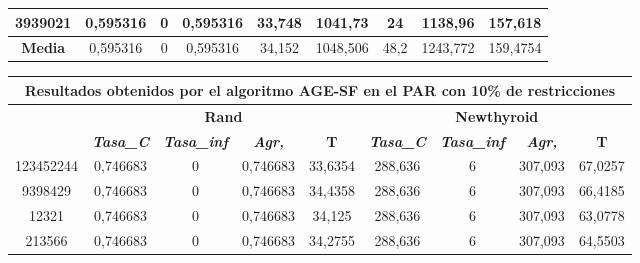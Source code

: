 \documentclass[12pt, spanish]{article}
\begin{document}
\begin{table}[H]
\begin{tabular}{|c|c|c|c|c|c|c|c|c|}
3939021           & 0,595316                  & 0                           & 0,595316               & 33,748     & 1041,73                   & 24                          & 1138,96                & 157,618    \\ \hline
\textbf{Media}    & 0,595316                  & 0                           & 0,595316               & 34,152     & 1048,506                  & 48,2                        & 1243,772               & 159,4754   \\ \hline
\end{tabular}
\end{table}

\begin{table}[H]
\footnotesize
\begin{tabular}{|c|c|c|c|c|c|c|c|c|}
\hline
\multicolumn{9}{|c|}{\textbf{Resultados obtenidos por el algoritmo AGE-SF en el PAR con 10\% de restricciones}}                                                                                                   \\ \hline
\multirow{2}{*}{} & \multicolumn{4}{c|}{\textbf{Rand}}                                                            & \multicolumn{4}{c|}{\textbf{Newthyroid}}                                                      \\ \cline{2-9} 
                  & \textit{\textbf{Tasa\_C}} & \textit{\textbf{Tasa\_inf}} & \textit{\textbf{Agr,}} & \textbf{T} & \textit{\textbf{Tasa\_C}} & \textit{\textbf{Tasa\_inf}} & \textit{\textbf{Agr,}} & \textbf{T} \\ \hline
123452244         & 0,746683                  & 0                           & 0,746683               & 33,6354    & 288,636                   & 6                           & 307,093                & 67,0257    \\ \hline
9398429           & 0,746683                  & 0                           & 0,746683               & 34,4358    & 288,636                   & 6                           & 307,093                & 66,4185    \\ \hline
12321             & 0,746683                  & 0                           & 0,746683               & 34,125     & 288,636                   & 6                           & 307,093                & 63,0778    \\ \hline
213566            & 0,746683                  & 0                           & 0,746683               & 34,2755    & 288,636                   & 6                           & 307,093                & 64,5503    \\ \hline

\end{tabular}
\end{table}
\end{document}
